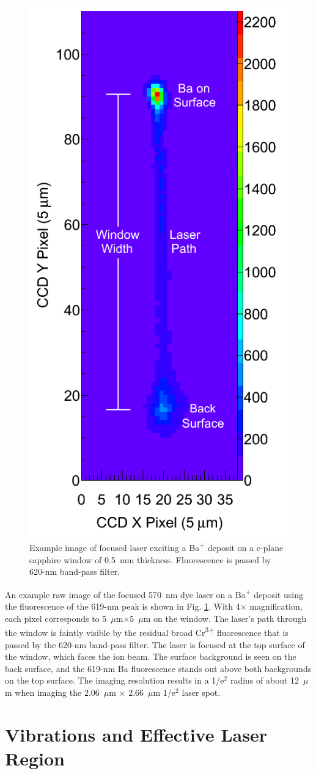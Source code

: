 \begin{figure} %
        \centering
                \includegraphics[width=.4\textwidth]{figures/imageExamp.png}
                \caption{Example image of focused laser exciting a Ba\textsuperscript{+} deposit on a c-plane sapphire window of 0.5~mm thickness.  Fluorescence is passed by 620-nm band-pass filter.}
\label{fig:imageexamp}
\end{figure}

An example raw image of the focused 570~nm dye laser on a Ba\textsuperscript{+} deposit using the fluorescence of the 619-nm peak is shown in Fig. \ref{fig:imageexamp}.  With 4$\times$ magnification, each pixel corresponds to 5~$\mu$m$\times$5~$\mu$m on the window.  The laser's path through the window is faintly visible by the residual broad Cr\textsuperscript{3+} fluorescence that is passed by the 620-nm band-pass filter.  The laser is focused at the top surface of the window, which faces the ion beam.  The surface background is seen on the back surface, and the 619-nm Ba fluorescence stands out above both backgrounds on the top surface.  The imaging resolution results in a 1/e$^{2}$ radius of about 12~$\mu$m when imaging the 2.06~$\mu$m $\times$ 2.66~$\mu$m 1/e$^{2}$ laser spot.

\section{Vibrations and Effective Laser Region}
\label{sec:vibes}

